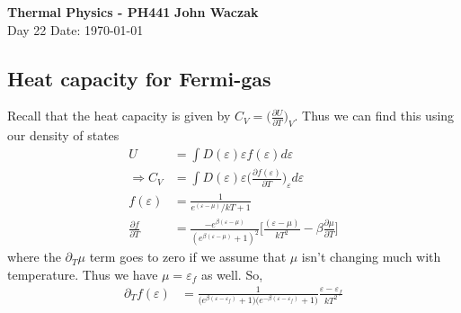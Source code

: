 \documentclass[a4paper, 11pt]{article}
\begin{document}
	\noindent
	\large\textbf{Thermal Physics - PH441} \hfill \textbf{John Waczak} \\
	\normalsize Day 22 \hfill  Date: \today \\
	
\subsection*{Heat capacity for Fermi-gas} 
	Recall that the heat capacity is given by $C_V = \big(\frac{\partial U}{\partial T}\big)_V$. Thus we can find this using our density of states
		\begin{align*}
			U &= \int D(\varepsilon)\varepsilon f(\varepsilon)d\varepsilon \\ 
			\Rightarrow C_V &= \int D(\varepsilon)\varepsilon \Big(\frac{\partial f(\varepsilon)}{\partial T}\Big)_\varepsilon d\varepsilon \\ 
			f(\varepsilon) &= \frac{1}{e^(\varepsilon-\mu)/kT + 1} \\ 
			\frac{\partial f}{\partial T} &= \frac{-e^{\beta(\varepsilon-\mu)}}{(e^{\beta(\varepsilon-\mu)}+1)^2}\Big[\frac{(\varepsilon-\mu)}{kT^2}-\beta\frac{\partial \mu}{\partial T}\Big]
		\end{align*}
	where the $\partial_T \mu$ term goes to zero if we assume that $\mu$ isn't changing much with temperature. Thus we have $\mu=\varepsilon_f$ as well. So,  
		\begin{align*}
			\partial_T f(\varepsilon) &= \frac{1}{\Big(e^{\beta(\varepsilon-\varepsilon_f)}+1\Big)\Big(e^{-\beta(\varepsilon-\varepsilon_f)}+1\Big)}\frac{\varepsilon-\varepsilon_f}{kT^2}
		\end{align*}
\end{document}
